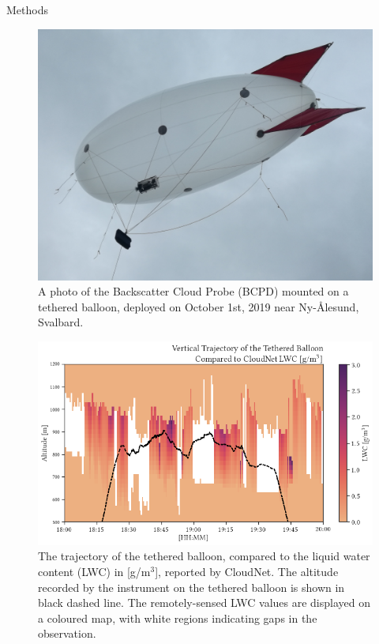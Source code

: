 \documentclass[final]{beamer}
\newlength{\colwidth}
\begin{document}
\begin{frame}[t]
\begin{columns}[t]
\begin{column}{\colwidth}
\begin{block}{Methods}
        \begin{figure}
          \centering
          \includegraphics[width=0.8\colwidth]{figure/balloon.png}
          \caption{A photo of the Backscatter Cloud Probe (BCPD) mounted on a tethered balloon, deployed on October 1st, 2019 near Ny-\r{A}lesund, Svalbard.}
        \end{figure}
      \end{block}

      \begin{figure}
        \centering
        \includegraphics[width=\colwidth]{figure/ts_alt.png}
        \caption{The trajectory of the tethered balloon, compared to the liquid water content (LWC) in [g/m$^3$], reported by CloudNet. The altitude recorded by the instrument on the tethered balloon is shown in black dashed line. The remotely-sensed LWC values are displayed on a coloured map, with white regions indicating gaps in the observation.}
      \end{figure}


\end{column}
\end{columns}
\end{frame}
\end{document}
